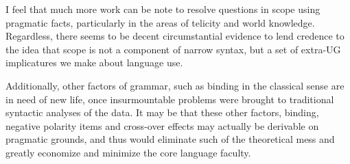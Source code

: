 \documentclass{article}
\begin{document}
I feel that much more work can be note to resolve questions in scope using pragmatic facts, particularly in the areas of telicity and world knowledge. Regardless, there seems to be decent circumstantial evidence to lend credence to the idea that scope is not a component of narrow syntax, but a set of extra-UG implicatures we make about language use.

Additionally, other factors of grammar, such as binding in the classical sense are in need of new life, once insurmountable problems were brought to traditional syntactic analyses of the data. It may be that these other factors, binding, negative polarity items and cross-over effects may actually be derivable on pragmatic grounds, and thus would eliminate such of the theoretical mess and greatly economize and minimize the core language faculty.


\printbibliography
\end{document}
